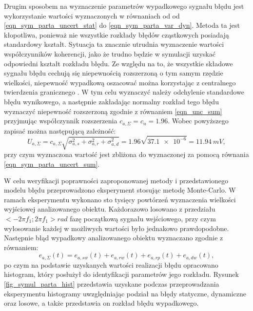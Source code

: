 Drugim sposobem na wyznaczenie parametrów wypadkowego sygnału błędu jest wykorzystanie wartości wyznaczonych w równaniach od od \eqref{eqn_sym_parta_uncert_stat} do \eqref{eqn_sym_parta_var_dyn}. Metoda ta jest kłopotliwa, ponieważ nie wszystkie rozkłady błędów cząstkowych posiadają standardowy kształt. Sytuacja ta znacznie utrudnia wyznaczenie wartości współczynników koherencji, jako że trudno będzie w symulacji uzyskać odpowiedni kształt rozkładu błędu. Ze względu na to, że wszystkie składowe sygnału błędu cechują się niepewnością rozszerzoną o tym samym rzędzie wielkości, niepewność wypadkową oszacować można korzystając z centralnego twierdzenia granicznego \cite{jcgm_guide}. W tym celu wyznaczyć należy odchylenie standardowe błędu wynikowego, a następnie zakładając normalny rozkład tego błędu wyznaczyć niepewność rozszerzoną zgodnie z równaniem \eqref{eqn_unc_sum} przyjmując współczynnik rozszerzenia $c_{a,\Sigma} = c_{n} = 1.96$. Wobec powyższego zapisać można następującą zależność:
\begin{equation}
U_{a,\Sigma} = c_{a,\Sigma} \sqrt{\sigma_{a,s}^{2} + \sigma_{a,r}^{2} + \sigma_{a,d}^{2}} = 1.96 \sqrt{\num{37.1e-6}} = \qty{11.94}{mV} \label{eqn_sym_parta_uncert_value_b},
\end{equation}
przy czym wyznaczona wartość jest zbliżona do wyznaczonej za pomocą równania \eqref{eqn_sym_parta_uncert_sum}.

W celu weryfikacji poprawności zaproponowanej metody i przedstawionego modelu błędu przeprowadzono eksperyment stosując metodę Monte-Carlo. W ramach eksperymentu wykonano sto tysięcy powtórzeń wyznaczenia wielkości wyjściowej analizowanego obiektu. Każdorazowo losowano z przedziału $<-2 \pi f_{1};2 \pi f_{1}>\unit{rad}$ fazę początkową sygnału wejściowego, przy czym wylosowanie każdej w możliwych wartości było jednakowo prawdopodobne. Następnie błąd wypadkowy analizowanego obiektu wyznaczano zgodnie z równaniem:
\begin{equation}
e_{a,\Sigma} \left( t \right) = e_{a,sw} \left( t \right) + e_{a,rw} \left( t \right) + e_{a,rp} \left( t \right) + e_{a,dw} \left( t \right) \label{eqn_sym_parta_error_sum},
\end{equation}
po czym na podstawie uzyskanych wartości realizacji błędu opracowano histogram, który posłużył do identyfikacji parametrów jego rozkładu. Rysunek \ref{fig_symul_parta_hist} przedstawia uzyskane podczas przeprowadzania eksperymentu histogramy uwzględniając podział na błędy statyczne, dynamiczne oraz losowe, a także przedstawia on rozkład błędu wypadkowego.

